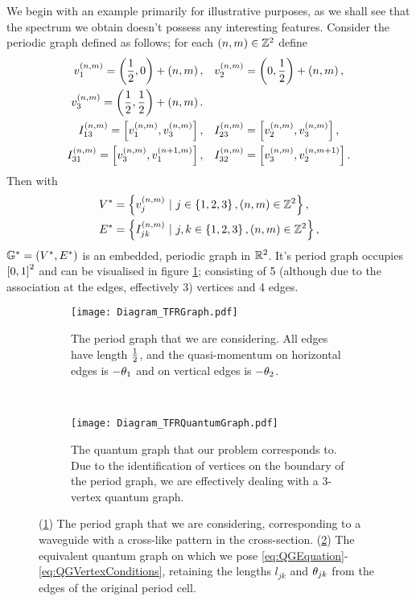 We begin with an example primarily for illustrative purposes, as we shall see that the spectrum we obtain doesn't possess any interesting features.
Consider the periodic graph defined as follows; for each $\left( n,m \right)\in\mathbb{Z}^2$ define
\begin{align*}
	v_1^{\left( n,m \right)} = \left( \frac{1}{2},0 \right) + \left( n,m \right), 
	&\quad v_2^{\left( n,m \right)} = \left( 0,\frac{1}{2} \right) + \left( n,m \right), \\
	v_3^{\left( n,m \right)} = \left( \frac{1}{2},\frac{1}{2} \right) + \left( n,m \right). & \\
	I_{13}^{\left( n,m \right)} = \left[ v_1^{\left( n,m \right)}, v_3^{\left( n,m \right)} \right],
	&\quad I_{23}^{\left( n,m \right)} = \left[ v_2^{\left( n,m \right)}, v_3^{\left( n,m \right)} \right], \\
	I_{31}^{\left( n,m \right)} = \left[ v_3^{\left( n,m \right)}, v_1^{\left( n+1,m \right)} \right],
	&\quad I_{32}^{\left( n,m \right)} = \left[ v_3^{\left( n,m \right)}, v_2^{\left( n,m+1 \right)} \right].
\end{align*}
Then with 
\begin{align*}
	V^* &= \clbracs{v_j^{\bracs{n,m}} \ \vert \ j\in\clbracs{1,2,3}, \bracs{n,m}\in\integers^2}, \\
	E^* &= \clbracs{I_{jk}^{\bracs{n,m}} \ \vert \ j,k\in\clbracs{1,2,3}, \bracs{n,m}\in\integers^2},
\end{align*}
$\mathbb{G}^* = \left( V^*,E^* \right)$ is an embedded, periodic graph in $\mathbb{R}^2$.
It's period graph occupies $\left[ 0,1 \right]^2$ and can be visualised in figure \ref{fig:Diagram_TFRGraph}; consisting of 5 (although due to the association at the edges, effectively 3) vertices and 4 edges.
\begin{figure}[b!]
	\centering
	\begin{subfigure}[t]{0.45\textwidth}
		\centering
		\texttt{[image: Diagram\_TFRGraph.pdf]}
		\caption{\label{fig:Diagram_TFRGraph} The period graph that we are considering. All edges have length $\frac{1}{2}$, and the quasi-momentum on horizontal edges is $-\theta_1$ and on vertical edges is $-\theta_2$.}
	\end{subfigure}
	~
	\begin{subfigure}[t]{0.45\textwidth}
		\centering
		\texttt{[image: Diagram\_TFRQuantumGraph.pdf]}
		\caption{\label{fig:Diagram_TFRQuantumGraph} The quantum graph that our problem corresponds to. Due to the identification of vertices on the boundary of the period graph, we are effectively dealing with a 3-vertex quantum graph.}
	\end{subfigure}
	\caption{\label{fig:5VertexCross} (\ref{fig:Diagram_TFRGraph}) The period graph that we are considering, corresponding to a waveguide with a cross-like pattern in the cross-section. (\ref{fig:Diagram_TFRQuantumGraph}) The equivalent quantum graph on which we pose \eqref{eq:QGEquation}-\eqref{eq:QGVertexConditions}, retaining the lengths $l_{jk}$ and $\theta_{jk}$ from the edges of the original period cell.}
\end{figure}
